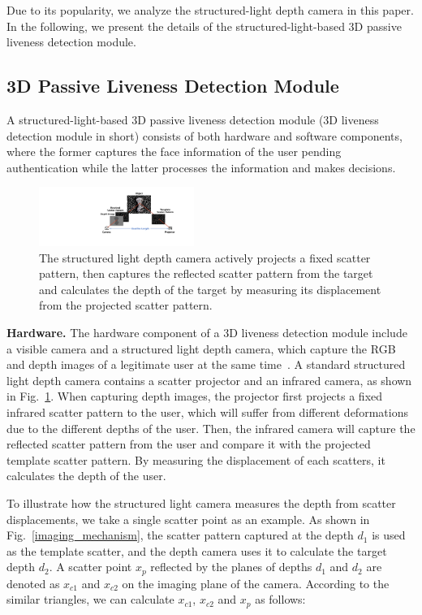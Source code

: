 Due to its popularity, we analyze the structured-light depth camera in this paper. In the following, we present the details of the structured-light-based 3D passive liveness detection module.


\subsection{3D Passive Liveness Detection Module}
A structured-light-based 3D passive liveness detection module (3D liveness detection module in short) consists of both hardware and software components, where the former captures the face information of the user pending authentication while the latter processes the information and makes decisions.

\begin{figure}[pt]
	\centerline{\includegraphics[width = 0.45\textwidth]{figures/structured_light_camera.pdf}}
	\vspace{-0.1in}
	\caption{The structured light depth camera actively projects a fixed scatter pattern, then captures the reflected scatter pattern from the target and calculates the depth of the target by measuring its displacement from the projected scatter pattern. }
	\label{depth_camera}
	\vspace{-0.15in}
\end{figure}

\textbf{Hardware.}
The hardware component  of a 3D liveness detection module include a visible camera and a structured light depth camera, which capture the RGB and depth images of a legitimate user  at the same time~\cite{zanuttigh2016time, daneshmand20183d}. 
A standard structured light depth camera contains a scatter projector and an infrared camera, as shown in Fig.~\ref{depth_camera}.
When capturing depth images,  the projector first projects a fixed infrared scatter pattern to the user, which will suffer from different deformations due to the different depths of the user. Then, the infrared camera will capture the reflected scatter pattern from the user and compare it with the projected template scatter pattern.  By measuring the displacement of each scatters, it calculates the depth of the user.

To illustrate how the structured light camera measures the depth from scatter displacements, we take a single scatter point as an example.
As shown in Fig.~\ref{imaging_mechanism},  the scatter pattern captured at the depth $d_1$ is used as the template scatter, and  the depth camera uses it  to calculate the target depth $d_2$. A scatter point $x_p$ reflected by the planes of depths $d_1$ and $d_2$ are denoted as $x_{c1}$ and $x_{c2}$ on the imaging plane of the camera. According to the similar triangles, we can calculate $x_{c1}$, $x_{c2}$ and $x_p$ as follows:

